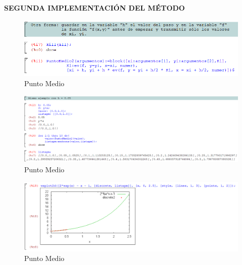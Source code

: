 \documentclass[paper=a4, fontsize=11pt]{scrartcl} %
\numberwithin{equation}{section}
\begin{document}
	
	\textbf{SEGUNDA IMPLEMENTACIÓN DEL MÉTODO}
	\begin{figure}[H]
		\includegraphics[width=1\textwidth]{Pm4.png}
		\caption{Punto Medio}
		\label{fig:Pm4}
	\end{figure}
	\begin{figure}[H]
		\includegraphics[width=1\textwidth]{Pm5.png}
		\caption{Punto Medio}
		\label{fig:Pm5}
	\end{figure}
	\begin{figure}[H]
		\includegraphics[width=1\textwidth]{Pm6.png}
		\caption{Punto Medio}
		\label{fig:Pm6}
	\end{figure}
	
\end{document}
